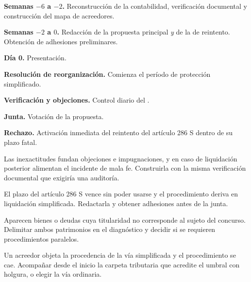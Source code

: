 \begin{checklist}
  \item \textbf{Semanas $-6$ a $-2$.} Reconstrucción de la contabilidad, verificación
  documental y construcción del mapa de acreedores.
  \item \textbf{Semanas $-2$ a $0$.} Redacción de la propuesta principal \emph{y} de la
  de reintento. Obtención de adhesiones preliminares.
  \item \textbf{Día 0.} Presentación.
  \item \textbf{Resolución de reorganización.} Comienza el período de protección
  simplificado.
  \item \textbf{Verificación y objeciones.} Control diario del \boletin{}.
  \item \textbf{Junta.} Votación de la propuesta.
  \item \textbf{Rechazo.} Activación inmediata del reintento del artículo 286 S dentro de
  su plazo fatal.
\end{checklist}

\bloqueErrores

{Las inexactitudes fundan objeciones e impugnaciones, y en caso de liquidación posterior
alimentan el incidente de mala fe.}
{Construirla con la misma verificación documental que exigiría una auditoría.}

{El plazo del artículo 286 S vence sin poder usarse y el procedimiento deriva en
liquidación simplificada.}
{Redactarla y obtener adhesiones antes de la junta.}

{Aparecen bienes o deudas cuya titularidad no corresponde al sujeto del concurso.}
{Delimitar ambos patrimonios en el diagnóstico y decidir si se requieren procedimientos
paralelos.}

{Un acreedor objeta la procedencia de la vía simplificada y el procedimiento se cae.}
{Acompañar desde el inicio la carpeta tributaria que acredite el umbral con holgura, o
elegir la vía ordinaria.}

